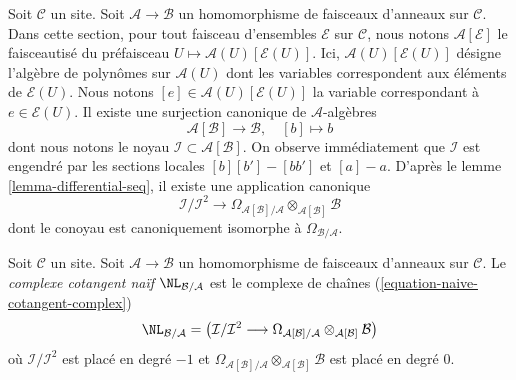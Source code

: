 \medskip\noindent
Soit $\mathcal{C}$ un site. Soit $\mathcal{A} \to \mathcal{B}$ un
homomorphisme de faisceaux d'anneaux sur $\mathcal{C}$. Dans cette section,
pour tout faisceau d'ensembles $\mathcal{E}$ sur $\mathcal{C}$, nous notons
$\mathcal{A}[\mathcal{E}]$ le faisceautisé du préfaisceau
$U \mapsto \mathcal{A}(U)[\mathcal{E}(U)]$. Ici,
$\mathcal{A}(U)[\mathcal{E}(U)]$
désigne l'algèbre de polynômes sur $\mathcal{A}(U)$ dont les variables
correspondent aux éléments de $\mathcal{E}(U)$.
Nous notons $[e] \in \mathcal{A}(U)[\mathcal{E}(U)]$ la variable
correspondant à $e \in \mathcal{E}(U)$.
Il existe une surjection canonique de $\mathcal{A}$-algèbres
\begin{equation}
\label{equation-canonical-presentation}
\mathcal{A}[\mathcal{B}] \longrightarrow \mathcal{B},\quad [b] \longmapsto b
\end{equation}
dont nous notons le noyau $\mathcal{I} \subset \mathcal{A}[\mathcal{B}]$.
On observe immédiatement que $\mathcal{I}$ est engendré par les
sections locales $[b][b'] - [bb']$ et $[a] - a$. D'après le
lemme \ref{lemma-differential-seq}, il existe une application canonique
\begin{equation}
\label{equation-naive-cotangent-complex}
\mathcal{I}/\mathcal{I}^2
\longrightarrow
\Omega_{\mathcal{A}[\mathcal{B}]/\mathcal{A}}
\otimes_{\mathcal{A}[\mathcal{B}]} \mathcal{B}
\end{equation}
dont le conoyau est canoniquement isomorphe à $\Omega_{\mathcal{B}/\mathcal{A}}$.

\begin{definition}
\label{definition-naive-cotangent-complex}
Soit $\mathcal{C}$ un site. Soit $\mathcal{A} \to \mathcal{B}$ un
homomorphisme de faisceaux d'anneaux sur $\mathcal{C}$.
Le {\it complexe cotangent naïf} $\NL_{\mathcal{B}/\mathcal{A}}$
est le complexe de chaînes (\ref{equation-naive-cotangent-complex})
$$
\NL_{\mathcal{B}/\mathcal{A}} =
\left(\mathcal{I}/\mathcal{I}^2
\longrightarrow
\Omega_{\mathcal{A}[\mathcal{B}]/\mathcal{A}}
\otimes_{\mathcal{A}[\mathcal{B}]} \mathcal{B}\right)
$$
où $\mathcal{I}/\mathcal{I}^2$ est placé en degré $-1$ et
$\Omega_{\mathcal{A}[\mathcal{B}]/\mathcal{A}}
\otimes_{\mathcal{A}[\mathcal{B}]} \mathcal{B}$
est placé en degré $0$.
\end{definition}

